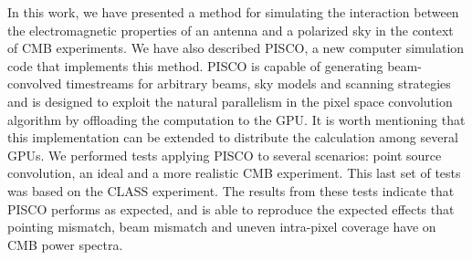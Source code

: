 \documentclass[a4paper,11pt]{article}
\begin{document}
In this work, we have presented a method for simulating the interaction between the electromagnetic properties of an antenna and a polarized sky in the context of CMB experiments. We have also described PISCO, a new computer simulation code that implements this method. PISCO is capable of generating beam-convolved timestreams for arbitrary beams, sky models and scanning strategies and is designed to exploit the natural parallelism in the pixel space convolution algorithm by offloading the computation to the GPU. It is worth mentioning that this implementation can be extended to distribute the calculation among several GPUs. We performed tests applying PISCO to several scenarios: point source convolution, an ideal and a more realistic CMB experiment. This last set of tests was based on the CLASS experiment. The results from these tests indicate that PISCO performs as expected, and is able to reproduce the expected effects that pointing mismatch, beam mismatch and uneven intra-pixel coverage have on CMB power spectra.





\appendix
\end{document}
